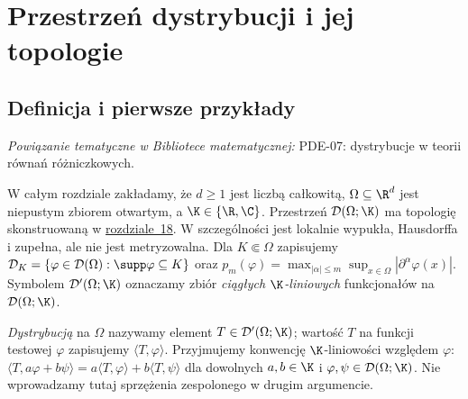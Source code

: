 \setcounter{section}{2}
\section{Przestrzeń dystrybucji i jej topologie}
\label{sec:dystrybucje19}

\providecommand{\atlasref}[2]{#2}


\subsection{Definicja i pierwsze przykłady}

\noindent\emph{Powiązanie tematyczne w Bibliotece matematycznej:} \atlasref{PDE-07::def:pde7-distribution}{PDE-07: dystrybucje w teorii równań różniczkowych}.


W całym rozdziale zakładamy, że $d\ge1$ jest liczbą całkowitą,
$\Omega\subseteq\R^d$ jest niepustym zbiorem otwartym,
a $\K\in\{\R,\C\}$.
Przestrzeń $\mathcal D(\Omega;\K)$ ma topologię skonstruowaną
w \hyperref[sec:funkcje-testowe18]{rozdziale~18}. W szczególności
jest lokalnie wypukła, Hausdorffa i zupełna, ale nie jest
metryzowalna. Dla $K\Subset\Omega$ zapisujemy
$\mathcal D_K=\{\varphi\in\mathcal D(\Omega):\supp\varphi\subseteq K\}$
oraz $p_m(\varphi)=\max_{|\alpha|\le m}\sup_{x\in\Omega}
|\partial^\alpha\varphi(x)|$. Symbolem $\mathcal D'(\Omega;\K)$
oznaczamy zbiór \emph{ciągłych $\K$-liniowych} funkcjonałów
na $\mathcal D(\Omega;\K)$.

\begin{definicja}[Dystrybucja]
\label{def:distribution19}
\emph{Dystrybucją} na $\Omega$ nazywamy element
$T\in\mathcal D'(\Omega;\K)$; wartość $T$ na funkcji
testowej $\varphi$ zapisujemy $\langle T,\varphi\rangle$.
Przyjmujemy konwencję $\K$-liniowości względem $\varphi$:
$\langle T,a\varphi+b\psi\rangle=a\langle T,\varphi\rangle+
b\langle T,\psi\rangle$ dla dowolnych $a,b\in\K$
i $\varphi,\psi\in\mathcal D(\Omega;\K)$.
Nie wprowadzamy tutaj sprzężenia
zespolonego w drugim argumencie.
\end{definicja}

